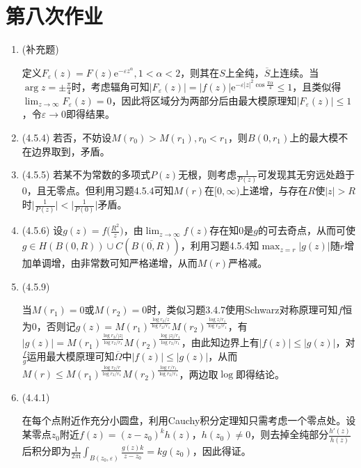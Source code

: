 \documentclass[a4paper,UTF8,fontset=windows]{ctexart}
\begin{document}
\section{第八次作业}
\begin{enumerate}
    \item (补充题)
    
    定义$F_\varepsilon(z)=F(z)\mathrm{e}^{-\varepsilon z^\alpha},1<\alpha<2$，则其在$S$上全纯，$\overline{S}$上连续。当$\arg z=\pm\frac{\pi}{4}$时，考虑辐角可知$|F_\varepsilon(z)|=|f(z)|\mathrm{e}^{-\varepsilon|z|^2\cos\frac{\pi\alpha}{4}}\le1$，且类似得$\lim_{z\to\infty}F_\varepsilon(z)=0$，因此将区域分为两部分后由最大模原理知$|F_\varepsilon(z)|\le1$，令$\varepsilon\to0$即得结果。
    
    \item (4.5.4)
    若否，不妨设$M(r_0)>M(r_1),r_0<r_1$，则$B(0,r_1)$上的最大模不在边界取到，矛盾。
    
    \item (4.5.5)
    若某不为常数的多项式$P(z)$无根，则考虑$\frac{1}{P(z)}$可发现其无穷远处趋于0，且无零点。但利用习题4.5.4可知$M(r)$在$[0,\infty)$上递增，与存在$R$使$|z|>R$时$\big|\frac{1}{P(z)}\big|<\big|\frac{1}{P(0)}\big|$矛盾。
    
    \item (4.5.6)
    设$g(z)=f\big(\frac{R^2}{z}\big)$，由$\lim_{z\to\infty}f(z)$存在知0是$g$的可去奇点，从而可使$g\in H(B(0,R))\cup C(\overline{B(0,R)})$，利用习题4.5.4知$\max_{z=r}|g(z)|$随$r$增加单调增，由非常数可知严格递增，从而$M(r)$严格减。
    
    \item (4.5.9)
    
    当$M(r_1)=0$或$M(r_2)=0$时，类似习题3.4.7使用Schwarz对称原理可知$f$恒为0，否则记$g(z)=M(r_1)^\frac{\log r_2/z}{\log r_2/r_1}M(r_2)^\frac{\log z/r_1}{\log r_2/r_1}$，有$|g(z)|=M(r_1)^\frac{\log r_2/|z|}{\log r_2/r_1}M(r_2)^\frac{\log |z|/r_1}{\log r_2/r_1}$，由此知边界上有$|f(z)|\le|g(z)|$，对$\frac{f}{g}$运用最大模原理可知$\overline{\Omega}$中$|f(z)|\le|g(z)|$，从而$M(r)\le M(r_1)^\frac{\log r_2/r}{\log r_2/r_1}M(r_2)^\frac{\log r/r_1}{\log r_2/r_1}$，两边取$\log$即得结论。
    
    \item (4.4.1)
    
    在每个点附近作充分小圆盘，利用Cauchy积分定理知只需考虑一个零点处。设某零点$z_0$附近$f(z)=(z-z_0)^kh(z)$，$h(z_0)\ne0$，则去掉全纯部分$\frac{h'(z)}{h(z)}$后积分即为$\frac{1}{2\pi\mathrm{i}}\int_{B(z_0,\varepsilon)}\frac{g(z)k}{z-z_0}=kg(z_0)$，因此得证。
    

\end{enumerate}
\end{document}
